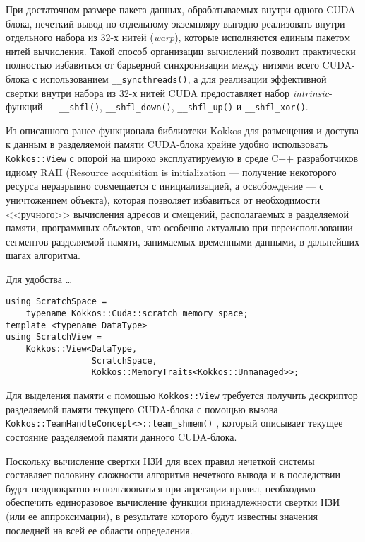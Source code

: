 При достаточном размере пакета данных, обрабатываемых внутри одного CUDA-блока, нечеткий вывод по отдельному экземпляру выгодно реализовать внутри отдельного набора из 32-х нитей (\textit{warp}), которые исполняются единым пакетом нитей вычисления. Такой способ организации вычислений позволит практически полностью избавиться от барьерной синхронизации между нитями всего CUDA-блока с использованием \lstinline|__syncthreads()|, а для реализации эффективной свертки внутри набора из 32-х нитей CUDA предоставляет набор \textit{intrinsic}-функций --- \lstinline|__shfl()|, \lstinline|__shfl_down()|, \lstinline|__shfl_up()| и \lstinline|__shfl_xor()|.

Из описанного ранее функционала библиотеки Kokkos для размещения и доступа к данным в разделяемой памяти CUDA-блока крайне удобно использовать \lstinline|Kokkos::View| с опорой на широко эксплуатируемую в среде C++ разработчиков идиому RAII (Resource acquisition is initialization --- получение некоторого ресурса неразрывно совмещается с инициализацией, а освобождение --- с уничтожением объекта), которая позволяет избавиться от необходимости <<ручного>> вычисления адресов и смещений, располагаемых в разделяемой памяти, программных объектов, что особенно актуально при переиспользовании сегментов разделяемой памяти, занимаемых временными данными, в дальнейших шагах алгоритма.

Для удобства \dots

\begin{verbatim}
using ScratchSpace =
	typename Kokkos::Cuda::scratch_memory_space;
template <typename DataType>
using ScratchView =
	Kokkos::View<DataType,
				 ScratchSpace,
				 Kokkos::MemoryTraits<Kokkos::Unmanaged>>;
\end{verbatim}

Для выделения памяти c помощью \lstinline|Kokkos::View| требуется получить дескриптор разделяемой памяти текущего CUDA-блока с помощью вызова \lstinline|Kokkos::TeamHandleConcept<>::team_shmem()| , который описывает текущее состояние разделяемой памяти данного CUDA-блока.

Поскольку вычисление свертки НЗИ для всех правил нечеткой системы составляет половину сложности алгоритма нечеткого вывода и в последствии будет неоднократно использооваться при агрегации правил, необходимо обеспечить единоразовое вычисление функции принадлежности свертки НЗИ (или ее аппроксимации), в результате которого будут известны значения последней на всей ее области определения.

